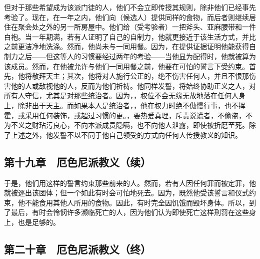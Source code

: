 但对于那些希望成为该派门徒的人，他们不会立即传授其规则，除非他们已经事先考验了。现在，在一年之内，他们向（候选人）提供同样的食物，而后者则继续居住在聚会处之外的另一所房屋中。他们给（受考验者）一把斧头、亚麻腰带和一件白袍。当一年期满，若有人证明了自己的自制力，他就更接近于该生活方式，并比之前更洁净地洗涤。然而，他尚未与一同用餐。因为，在提供证据证明他能获得自制力之后——但这等人的习惯要经过两年的考验——当他显为配得时，他就被算为该成员。然而，在他被允许与他们一同用餐之前，他要在可怕的誓言下受约束。首先，他将敬拜天主；其次，他将对人施行公正的，绝不伤害任何人，并且不恨那伤害他的人或敌视他的人，反而为他们祈祷。他同样发誓，将始终协助正义之人，对所有人守信，尤其是对那些统治者。因为，，权位不会无缘无故地落在任何人身上，除非出于天主。而如果本人是统治者，，他在权力时绝不傲慢行事，也不挥霍，或采用任何装饰，或超过习惯的更。，要热爱真理，斥责说谎者，不偷盗，不为不义之财玷污良心，不向本派成员隐瞒，也不向他人泄露，即使被折磨至死。除了上述之外，他发誓不以不同于他自己领受的方式向任何人传授教义的知识。\par


\subsection{第十九章　厄色尼派教义（续）}

于是，他们用这样的誓言约束那些前来的人。然而，若有人因任何罪而被定罪，他就被逐出该团体；但一个如此有时会可怕地死去。因为，既然他受该誓言和仪式约束，他不能食用其他人所用的食物。因此，有时完全因饥饿而毁坏身体。所以，到了最后，有时会怜悯许多濒临死亡的人，因为他们认为即使死亡这样刑罚在这些身上，也是足够的。\par


\subsection{第二十章　厄色尼派教义（终）}

